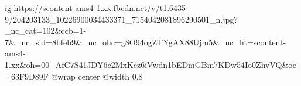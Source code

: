  
 
 
 
 

\ifcmt
  ig https://scontent-ams4-1.xx.fbcdn.net/v/t1.6435-9/204203133_10226900034433371_7154042081896290501_n.jpg?_nc_cat=102&ccb=1-7&_nc_sid=8bfeb9&_nc_ohc=g8O94ogZTYgAX88Ujm5&_nc_ht=scontent-ams4-1.xx&oh=00_AfC7S41JDY6c2MxKcz6iVwdn1bEDmGBm7KDw54Io0ZhvVQ&oe=63F9D89F
  @wrap center
  @width 0.8
\fi
